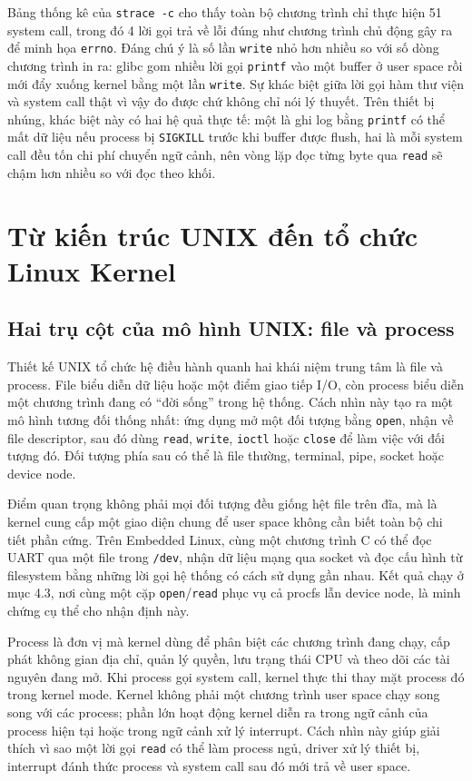 \documentclass[11pt]{article}
\newcommand{\code}[1]{\texttt{#1}}
\begin{document}
Bảng thống kê của \code{strace -c} cho thấy toàn bộ chương trình chỉ thực hiện 51 system call, trong đó 4 lời gọi trả về lỗi đúng như chương trình chủ động gây ra để minh họa \code{errno}. Đáng chú ý là số lần \code{write} nhỏ hơn nhiều so với số dòng chương trình in ra: glibc gom nhiều lời gọi \code{printf} vào một buffer ở user space rồi mới đẩy xuống kernel bằng một lần \code{write}. Sự khác biệt giữa lời gọi hàm thư viện và system call thật vì vậy đo được chứ không chỉ nói lý thuyết. Trên thiết bị nhúng, khác biệt này có hai hệ quả thực tế: một là ghi log bằng \code{printf} có thể mất dữ liệu nếu process bị \code{SIGKILL} trước khi buffer được flush, hai là mỗi system call đều tốn chi phí chuyển ngữ cảnh, nên vòng lặp đọc từng byte qua \code{read} sẽ chậm hơn nhiều so với đọc theo khối.

\section{Từ kiến trúc UNIX đến tổ chức Linux Kernel}

\subsection{Hai trụ cột của mô hình UNIX: file và process}

Thiết kế UNIX tổ chức hệ điều hành quanh hai khái niệm trung tâm là file và process. File biểu diễn dữ liệu hoặc một điểm giao tiếp I/O, còn process biểu diễn một chương trình đang có ``đời sống'' trong hệ thống. Cách nhìn này tạo ra một mô hình tương đối thống nhất: ứng dụng mở một đối tượng bằng \code{open}, nhận về file descriptor, sau đó dùng \code{read}, \code{write}, \code{ioctl} hoặc \code{close} để làm việc với đối tượng đó. Đối tượng phía sau có thể là file thường, terminal, pipe, socket hoặc device node.

Điểm quan trọng không phải mọi đối tượng đều giống hệt file trên đĩa, mà là kernel cung cấp một giao diện chung để user space không cần biết toàn bộ chi tiết phần cứng. Trên Embedded Linux, cùng một chương trình C có thể đọc UART qua một file trong \code{/dev}, nhận dữ liệu mạng qua socket và đọc cấu hình từ filesystem bằng những lời gọi hệ thống có cách sử dụng gần nhau. Kết quả chạy ở mục 4.3, nơi cùng một cặp \code{open}/\code{read} phục vụ cả procfs lẫn device node, là minh chứng cụ thể cho nhận định này.

Process là đơn vị mà kernel dùng để phân biệt các chương trình đang chạy, cấp phát không gian địa chỉ, quản lý quyền, lưu trạng thái CPU và theo dõi các tài nguyên đang mở. Khi process gọi system call, kernel thực thi thay mặt process đó trong kernel mode. Kernel không phải một chương trình user space chạy song song với các process; phần lớn hoạt động kernel diễn ra trong ngữ cảnh của process hiện tại hoặc trong ngữ cảnh xử lý interrupt. Cách nhìn này giúp giải thích vì sao một lời gọi \code{read} có thể làm process ngủ, driver xử lý thiết bị, interrupt đánh thức process và system call sau đó mới trả về user space.
\end{document}
